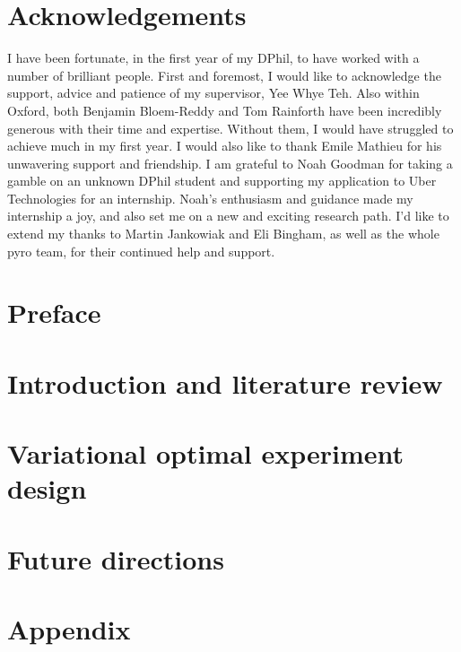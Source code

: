 \documentclass[a4paper, 10pt]{report}
\theoremstyle{plain}
\theoremstyle{definition}
\theoremstyle{remark}
\begin{document}
	
	
	
	\tableofcontents
	
\newpage
	\chapter*{Acknowledgements}
	I have been fortunate, in the first year of my DPhil, to have worked with a number of brilliant people. First and foremost, I would like to acknowledge the support, advice and patience of my supervisor, Yee Whye Teh. Also within Oxford, both Benjamin Bloem-Reddy and Tom Rainforth have been incredibly generous with their time and expertise. Without them, I would have struggled to achieve much in my first year. I would also like to thank Emile Mathieu for his unwavering support and friendship. I am grateful to Noah Goodman for taking a gamble on an unknown DPhil student and supporting my application to Uber Technologies for an internship. Noah's enthusiasm and guidance made my internship a joy, and also set me on a new and exciting research path. I'd like to extend my thanks to Martin Jankowiak and Eli Bingham, as well as the whole pyro team, for their continued help and support.
	
	
	
	\chapter*{Preface}
	\label{chap:preface}
	
	
	\chapter{Introduction and literature review}
	\label{chap:intro}
	
	
	\chapter{Variational optimal experiment design}
	\label{chap:voed}
	
	
	\chapter{Future directions}
	\label{chap:future}
	
	
	\chapter{Appendix}
	
	\clearpage %
	
	
	
	
\end{document}
